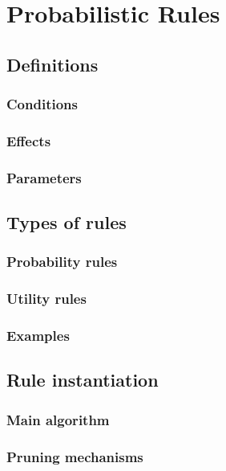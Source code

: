 \chapter{Probabilistic Rules}
\label{chap:rules}

\section{Definitions}

\subsection{Conditions}

\subsection{Effects}

\subsection{Parameters}

\section{Types of rules}

\subsection{Probability rules}

\subsection{Utility rules}

\subsection{Examples}

\section{Rule instantiation}

\subsection{Main algorithm}

\subsection{Pruning mechanisms}

